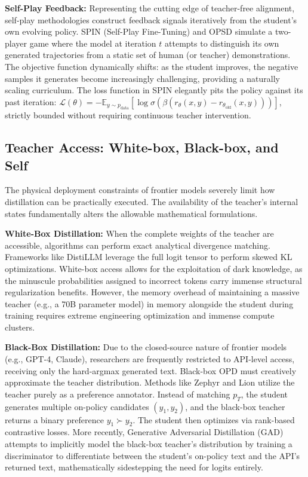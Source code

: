 \documentclass{article} %
\newcommand{\pteacher}{p_T}
\newcommand{\pdata}{p_{\mathrm{data}}}
\newcommand{\loss}{\mathcal{L}}
\begin{document}
\textbf{Self-Play Feedback:} Representing the cutting edge of teacher-free alignment, self-play methodologies construct feedback signals iteratively from the student's own evolving policy. SPIN (Self-Play Fine-Tuning) \citep{2401.01335} and OPSD \citep{2601.18734} simulate a two-player game where the model at iteration $t$ attempts to distinguish its own generated trajectories from a static set of human (or teacher) demonstrations. The objective function dynamically shifts: as the student improves, the negative samples it generates become increasingly challenging, providing a naturally scaling curriculum. The loss function in SPIN elegantly pits the policy against its past iteration: $\loss(\theta) = -\mathbb{E}_{y \sim \pdata} [\log \sigma(\beta(r_\theta(x,y) - r_{\theta_{\mathrm{old}}}(x,y)))]$, strictly bounded without requiring continuous teacher intervention.

\subsection{Teacher Access: White-box, Black-box, and Self}
\label{subsec:tax_access}

The physical deployment constraints of frontier models severely limit how distillation can be practically executed. The availability of the teacher's internal states fundamentally alters the allowable mathematical formulations.

\textbf{White-Box Distillation:} When the complete weights of the teacher are accessible, algorithms can perform exact analytical divergence matching. Frameworks like DistiLLM \citep{2402.03898} leverage the full logit tensor to perform skewed KL optimizations. White-box access allows for the exploitation of dark knowledge, as the minuscule probabilities assigned to incorrect tokens carry immense structural regularization benefits. However, the memory overhead of maintaining a massive teacher (e.g., a 70B parameter model) in memory alongside the student during training requires extreme engineering optimization and immense compute clusters.

\textbf{Black-Box Distillation:} Due to the closed-source nature of frontier models (e.g., GPT-4, Claude), researchers are frequently restricted to API-level access, receiving only the hard-argmax generated text. Black-box OPD must creatively approximate the teacher distribution. Methods like Zephyr \citep{2310.06694} and Lion \citep{2310.01382} utilize the teacher purely as a preference annotator. Instead of matching $\pteacher$, the student generates multiple on-policy candidates $(y_1, y_2)$, and the black-box teacher returns a binary preference $y_1 \succ y_2$. The student then optimizes via rank-based contrastive losses. More recently, Generative Adversarial Distillation (GAD) \citep{2511.10643} attempts to implicitly model the black-box teacher's distribution by training a discriminator to differentiate between the student's on-policy text and the API's returned text, mathematically sidestepping the need for logits entirely.
\end{document}
